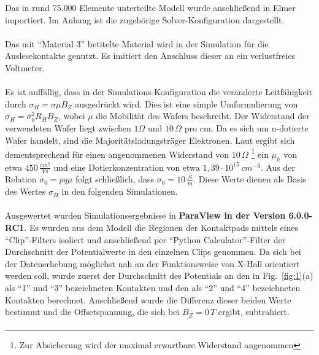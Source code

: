 \documentclass[12pt, a4paper]{article}
\begin{document}
Das in rund 75.000 Elemente unterteilte Modell wurde anschließend in Elmer importiert. Im Anhang ist die zugehörige Solver-Konfiguration dargestellt.\paragraph{}

Das mit ``Material 3'' betitelte Material wird in der Simulation für die Auslesekontakte genutzt. Es imitiert den Anschluss dieser an ein verlustfreies Voltmeter.\paragraph{}
Es ist auffällig, dass in der Simulations-Konfiguration die veränderte Leitfähigkeit durch $\sigma_H=\sigma\mu{B_Z}$ ausgedrückt wird. Dies ist eine simple Umformulierung von $\sigma_H=\sigma_0^2R_HB_Z$, wobei $\mu$ die Mobilität des Wafers beschreibt.\newline
Der Widerstand der verwendeten Wafer liegt zwischen $1\Omega$ und $10\,\Omega$ pro cm. Da es sich um n-dotierte Wafer handelt, sind die Majoritätsladungsträger Elektronen. Laut \cite{bowdenDopes} ergibt sich dementsprechend für einen angenommenen Widerstand von $10\,\Omega$ \footnote{Zur Absicherung wird der maximal erwartbare Widerstand angenommen} ein $\mu_h$ von etwa $450\,\frac{cm^2}{Vs}$ und eine Dotierkonzentration von etwa $1,39\cdot10^{15}\,cm^{-3}$. Aus der Relation $\sigma_0=pq\mu$ folgt schließlich, dass $\sigma_0=10\,\frac{S}{m}$. Diese Werte dienen als Basis des Wertes $\sigma_H$ in den folgenden Simulationen.\paragraph{}
Ausgewertet wurden Simulationsergebnisse in \textbf{ParaView in der Version 6.0.0-RC1}. Es wurden aus dem Modell die Regionen der Kontaktpads mittels eines ``Clip''-Filters isoliert und anschließend per ``Python Calculator''-Filter der Durchschnitt der Potentialwerte in den einzelnen Clips genommen.\newline
Da sich bei der Datenerhebung möglichst nah an der Funktionsweise von X-Hall orientiert werden soll, wurde zuerst der Durchschnitt des Potentials an den in Fig.~\ref{fig:1}(a) als ``1'' und ``3'' bezeichneten Kontakten und den als ``2'' und ``4'' bezeichneten Kontakten berechnet. Anschließend wurde die Differenz dieser beiden Werte bestimmt und die Offsetspannung, die sich bei $B_Z=0\,T$ ergibt, subtrahiert.\paragraph{}
\end{document}
